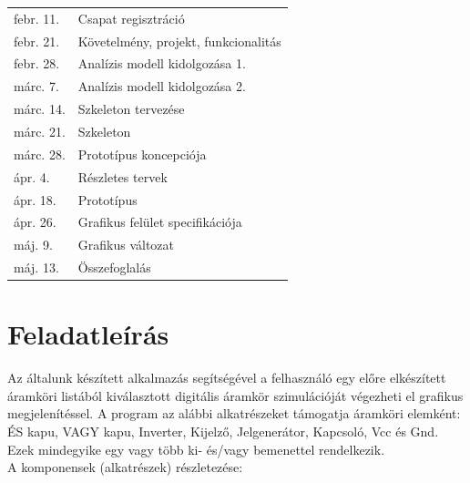 \begin{tabular}{l | l}
febr. 11. & Csapat regisztráció \\
febr. 21. & Követelmény, projekt, funkcionalitás \\
febr. 28. & Analízis modell kidolgozása 1. \\
márc. 7. & Analízis modell kidolgozása 2. \\
márc. 14. & Szkeleton tervezése \\
márc. 21. & Szkeleton \\
márc. 28. & Prototípus koncepciója \\
ápr.  4. & Részletes tervek \\
ápr. 18. & Prototípus \\
ápr. 26. & Grafikus felület specifikációja \\
máj. 9. & Grafikus változat \\
máj. 13. & Összefoglalás
\end{tabular}

\section{Feladatleírás}
\label{sec:taskdesc}

Az általunk készített alkalmazás segítségével a felhasználó egy előre elkészített áramköri listából kiválasztott digitális áramkör szimulációját végezheti el grafikus megjelenítéssel. A program az alábbi alkatrészeket támogatja áramköri elemként: ÉS kapu, VAGY kapu, Inverter, Kijelző, Jelgenerátor, Kapcsoló, Vcc és Gnd. Ezek mindegyike egy vagy több ki- és/vagy bemenettel rendelkezik.\\

\noindent A komponensek (alkatrészek) részletezése:

